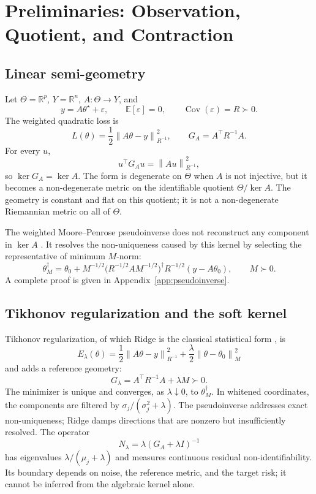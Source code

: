 \documentclass[10pt,a4paper]{article}
\newcommand{\R}{\mathbb{R}}
\newcommand{\E}{\mathbb{E}}
\newcommand{\Ker}{\operatorname{ker}}
\newcommand{\norm}[1]{\left\lVert #1\right\rVert}
\begin{document}
\section{Preliminaries: Observation, Quotient, and Contraction}
\subsection{Linear semi-geometry}
Let $\Theta=\R^p$, $Y=\R^n$, $A:\Theta\to Y$, and
\[
y=A\theta^\star+\varepsilon,\qquad \E[\varepsilon]=0,\qquad \operatorname{Cov}(\varepsilon)=R\succ0.
\]
The weighted quadratic loss is
\begin{equation}
L(\theta)=\frac12\norm{A\theta-y}_{R^{-1}}^2,
\qquad
G_A=A^\top R^{-1}A.
\end{equation}
For every $u$,
\[
u^\top G_Au=\norm{Au}_{R^{-1}}^2,
\]
so $\Ker G_A=\Ker A$. The form is degenerate on $\Theta$ when $A$ is not injective, but it becomes a non-degenerate metric on the identifiable quotient $\Theta/\Ker A$. The geometry is constant and flat on this quotient; it is not a non-degenerate Riemannian metric on all of $\Theta$.

The weighted Moore--Penrose pseudoinverse does not reconstruct any component in $\Ker A$ \citep{penrose1955}. It resolves the non-uniqueness caused by this kernel by selecting the representative of minimum $M$-norm:
\begin{equation}
\theta_M^\dagger
=
\theta_0+M^{-1/2}\bigl(R^{-1/2}AM^{-1/2}\bigr)^\dagger R^{-1/2}(y-A\theta_0),
\qquad M\succ0.
\end{equation}
A complete proof is given in Appendix~\ref{app:pseudoinverse}.

\subsection{Tikhonov regularization and the soft kernel}
Tikhonov regularization, of which Ridge is the classical statistical form \citep{tikhonov1963,hoerl1970}, is
\begin{equation}
E_\lambda(\theta)
=
\frac12\norm{A\theta-y}_{R^{-1}}^2
+
\frac\lambda2\norm{\theta-\theta_0}_M^2
\end{equation}
and adds a reference geometry:
\[
G_\lambda=A^\top R^{-1}A+\lambda M\succ0.
\]
The minimizer is unique and converges, as $\lambda\downarrow0$, to $\theta_M^\dagger$. In whitened coordinates, the components are filtered by $\sigma_j/(\sigma_j^2+\lambda)$. The pseudoinverse addresses exact non-uniqueness; Ridge damps directions that are nonzero but insufficiently resolved. The operator
\begin{equation}
N_\lambda=\lambda(G_A+\lambda I)^{-1}
\end{equation}
has eigenvalues $\lambda/(\mu_j+\lambda)$ and measures continuous residual non-identifiability. Its boundary depends on noise, the reference metric, and the target risk; it cannot be inferred from the algebraic kernel alone.
\end{document}
